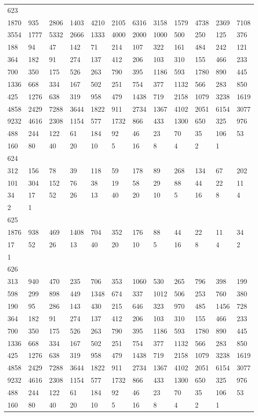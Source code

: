 \begin{longtable}{llllllllllll}
623&&&&&&&&&&&\\
1870& 935& 2806& 1403& 4210& 2105& 6316& 3158& 1579& 4738& 2369& 7108\\
3554& 1777& 5332& 2666& 1333& 4000& 2000& 1000& 500& 250& 125& 376\\
188& 94& 47& 142& 71& 214& 107& 322& 161& 484& 242& 121\\
364& 182& 91& 274& 137& 412& 206& 103& 310& 155& 466& 233\\
700& 350& 175& 526& 263& 790& 395& 1186& 593& 1780& 890& 445\\
1336& 668& 334& 167& 502& 251& 754& 377& 1132& 566& 283& 850\\
425& 1276& 638& 319& 958& 479& 1438& 719& 2158& 1079& 3238& 1619\\
4858& 2429& 7288& 3644& 1822& 911& 2734& 1367& 4102& 2051& 6154& 3077\\
9232& 4616& 2308& 1154& 577& 1732& 866& 433& 1300& 650& 325& 976\\
488& 244& 122& 61& 184& 92& 46& 23& 70& 35& 106& 53\\
160& 80& 40& 20& 10& 5& 16& 8& 4& 2& 1& \\

624&&&&&&&&&&&\\
312& 156& 78& 39& 118& 59& 178& 89& 268& 134& 67& 202\\
101& 304& 152& 76& 38& 19& 58& 29& 88& 44& 22& 11\\
34& 17& 52& 26& 13& 40& 20& 10& 5& 16& 8& 4\\
2& 1& \\

625&&&&&&&&&&&\\
1876& 938& 469& 1408& 704& 352& 176& 88& 44& 22& 11& 34\\
17& 52& 26& 13& 40& 20& 10& 5& 16& 8& 4& 2\\
1& \\

626&&&&&&&&&&&\\
313& 940& 470& 235& 706& 353& 1060& 530& 265& 796& 398& 199\\
598& 299& 898& 449& 1348& 674& 337& 1012& 506& 253& 760& 380\\
190& 95& 286& 143& 430& 215& 646& 323& 970& 485& 1456& 728\\
364& 182& 91& 274& 137& 412& 206& 103& 310& 155& 466& 233\\
700& 350& 175& 526& 263& 790& 395& 1186& 593& 1780& 890& 445\\
1336& 668& 334& 167& 502& 251& 754& 377& 1132& 566& 283& 850\\
425& 1276& 638& 319& 958& 479& 1438& 719& 2158& 1079& 3238& 1619\\
4858& 2429& 7288& 3644& 1822& 911& 2734& 1367& 4102& 2051& 6154& 3077\\
9232& 4616& 2308& 1154& 577& 1732& 866& 433& 1300& 650& 325& 976\\
488& 244& 122& 61& 184& 92& 46& 23& 70& 35& 106& 53\\
160& 80& 40& 20& 10& 5& 16& 8& 4& 2& 1& \\


\end{longtable}
